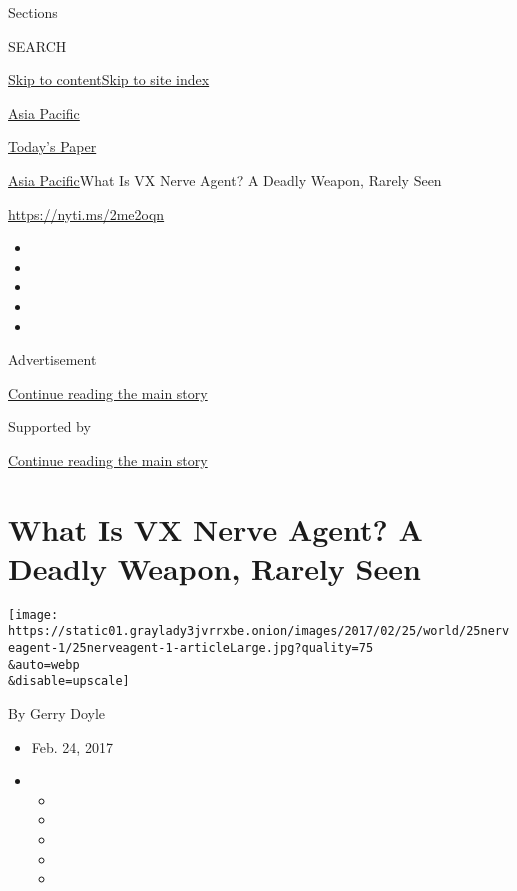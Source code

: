 Sections

SEARCH

\protect\hyperlink{site-content}{Skip to
content}\protect\hyperlink{site-index}{Skip to site index}

\href{https://www.nytimes3xbfgragh.onion/section/world/asia}{Asia
Pacific}

\href{https://myaccount.nytimes3xbfgragh.onion/auth/login?response_type=cookie\&client_id=vi}{}

\href{https://www.nytimes3xbfgragh.onion/section/todayspaper}{Today's
Paper}

\href{/section/world/asia}{Asia Pacific}\textbar{}What Is VX Nerve
Agent? A Deadly Weapon, Rarely Seen

\url{https://nyti.ms/2me2oqn}

\begin{itemize}
\item
\item
\item
\item
\item
\end{itemize}

Advertisement

\protect\hyperlink{after-top}{Continue reading the main story}

Supported by

\protect\hyperlink{after-sponsor}{Continue reading the main story}

\hypertarget{what-is-vx-nerve-agent-a-deadly-weapon-rarely-seen}{%
\section{What Is VX Nerve Agent? A Deadly Weapon, Rarely
Seen}\label{what-is-vx-nerve-agent-a-deadly-weapon-rarely-seen}}

\texttt{[image: https://static01.graylady3jvrrxbe.onion/images/2017/02/25/world/25nerveagent-1/25nerveagent-1-articleLarge.jpg?quality=75\\\&auto=webp\\\&disable=upscale]}

By Gerry Doyle

\begin{itemize}
\item
  Feb. 24, 2017
\item
  \begin{itemize}
  \item
  \item
  \item
  \item
  \item
  \end{itemize}
\end{itemize}


